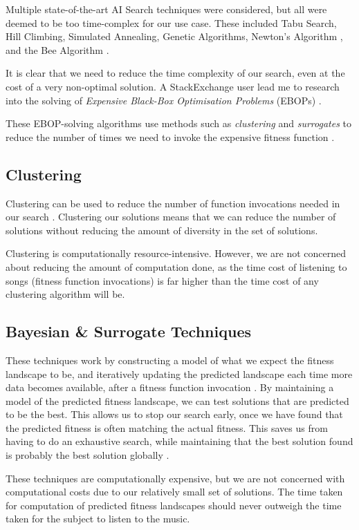 \documentclass{article}
\begin{document}
	Multiple state-of-the-art AI Search techniques were considered, but all were deemed to be too time-complex for our use case. These included Tabu Search, Hill Climbing, Simulated Annealing, Genetic Algorithms, Newton's Algorithm \cite{chandel_searching_2014}, and the Bee Algorithm \cite{pham_bee_nodate}.
	
	It is clear that we need to reduce the time complexity of our search, even at the cost of a very non-optimal solution. A StackExchange user lead me to research into the solving of \emph{Expensive Black-Box Optimisation Problems} (EBOPs) \cite{stackexchange_search_2018}.
	
	These EBOP-solving algorithms use methods such as \emph{clustering} and \emph{surrogates} to reduce the number of times we need to invoke the expensive fitness function \cite{boukouvala_derivative-free_2014, jones_efficient_nodate, dong_surrogate-based_2018}.
	
	\subsection{Clustering}
	Clustering can be used to reduce the number of function invocations needed in our search \cite{boukouvala_derivative-free_2014, wang_time_2017}. Clustering our solutions means that we can reduce the number of solutions without reducing the amount of diversity in the set of solutions.
	
	Clustering is computationally resource-intensive. However, we are not concerned about reducing the amount of computation done, as the time cost of listening to songs (fitness function invocations) is far higher than the time cost of any clustering algorithm will be.
	
	\subsection{Bayesian \& Surrogate Techniques}
	These techniques work by constructing a model of what we expect the fitness landscape to be, and iteratively updating the predicted landscape each time more data becomes available, after a fitness function invocation \cite{mockus_optimization_nodate, dong_surrogate-based_2018}. By maintaining a model of the predicted fitness landscape, we can test solutions that are predicted to be the best. This allows us to stop our search early, once we have found that the predicted fitness is often matching the actual fitness. This saves us from having to do an exhaustive search, while maintaining that the best solution found is probably the best solution globally \cite{boukouvala_derivative-free_2014}.
	
	These techniques are computationally expensive, but we are not concerned with computational costs due to our relatively small set of solutions. The time taken for computation of predicted fitness landscapes should never outweigh the time taken for the subject to listen to the music.
	
	
	
\end{document}
